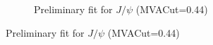 \begin{figure}
\begin{subfigure}{0.49\textwidth}
        \caption*{Preliminary fit for $J/\psi$ (MVACut=0.44)}
        \label{fig:prefit_mvascan_mvacut040_b}
    \end{subfigure}
\end{figure}